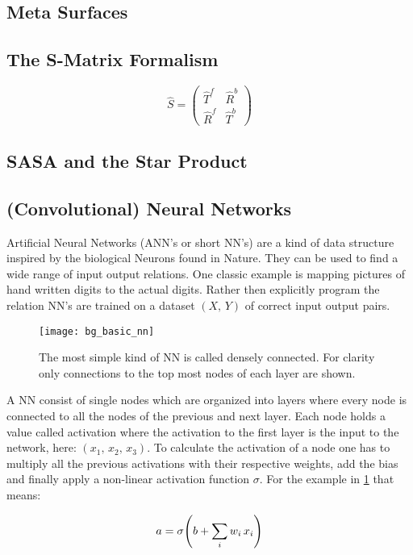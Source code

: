 \subsection{Meta Surfaces}

\subsection{The S-Matrix Formalism}

\begin{equation}
    \hat{S} =
    \begin{pmatrix}
        \hat{T}^f & \hat{R}^b \\
        \hat{R}^f & \hat{T}^b
    \end{pmatrix}
\end{equation}


\subsection{SASA and the Star Product}


\subsection{(Convolutional) Neural Networks}
Artificial Neural Networks (ANN's or short NN's) are a kind of data structure inspired by the biological Neurons found in Nature. They can be used to find a wide range of input output relations. One classic example is mapping pictures of hand written digits to the actual digits. Rather then explicitly program the relation NN's are trained on a dataset $(X, \, Y)$ of correct input output pairs.
\\


\begin{figure}[H]
    \centering
    \texttt{[image: bg\_basic\_nn]}
    \caption{The most simple kind of NN is called densely connected. For clarity only connections to the top most nodes of each layer are shown.}
    \label{fig:bg:basic_nn}
\end{figure}

A NN consist of single nodes which are organized into layers where every node is connected to all the nodes of the previous and next layer. Each node holds a value called activation where the activation to the first layer is the input to the network, here:
$(x_1, \, x_2, \, x_3)$.
To calculate the activation of a node one has to multiply all the previous activations with their respective weights, add the bias and finally apply a non-linear activation function $\sigma$. For the example in \ref{fig:bg:basic_nn} that means:

\begin{equation}
    a = \sigma \qty(b + \sum_i w_i \, x_i)
\end{equation}

